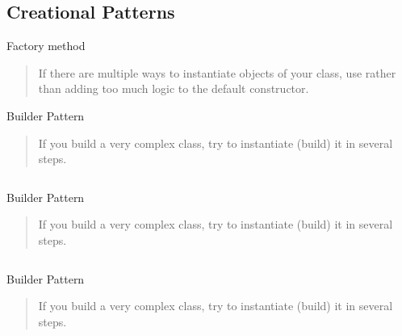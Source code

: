 \subsection{Creational Patterns}

\begin{frame}[t]{Factory method}
	\begin{quote}
		If there are multiple ways to instantiate objects of your class, use  rather than adding too much logic to the default constructor.
	\end{quote}
	
	\medskip
\end{frame}

\begin{frame}[t]{Builder Pattern}
	\begin{quote}
		If you build a very complex class, try to instantiate (build) it in several steps.
	\end{quote}

	\inputminted{python}{code/patterns/creational/builder_bad.py}	
\end{frame}

\begin{frame}[t]{Builder Pattern}
	\begin{quote}
		If you build a very complex class, try to instantiate (build) it in several steps.
	\end{quote}

	\inputminted{python}{code/patterns/creational/builder_bad_2.py}	

\end{frame}

\begin{frame}[t]{Builder Pattern}
	\begin{quote}
		If you build a very complex class, try to instantiate (build) it in several steps.
	\end{quote}
	
	\inputminted[]{python}{code/patterns/creational/builder_good.py}
\end{frame} 

